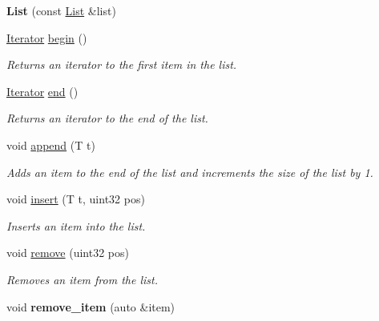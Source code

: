 \begin{DoxyCompactItemize}
\item 
\hypertarget{classetk_1_1_list_ac85e0e37f248ba1b52f410cd00c8c304}{{\bfseries List} (const \hyperlink{classetk_1_1_list}{List} \&list)}\label{classetk_1_1_list_ac85e0e37f248ba1b52f410cd00c8c304}

\item 
\hypertarget{classetk_1_1_list_afb70c4551d2e9ebc6b4bb04337d081e6}{\hyperlink{classetk_1_1_list_1_1_iterator}{Iterator} \hyperlink{classetk_1_1_list_afb70c4551d2e9ebc6b4bb04337d081e6}{begin} ()}\label{classetk_1_1_list_afb70c4551d2e9ebc6b4bb04337d081e6}

\begin{DoxyCompactList}\small\item\em Returns an iterator to the first item in the list. \end{DoxyCompactList}\item 
\hypertarget{classetk_1_1_list_a19b25cd89872debc07cc002c18845578}{\hyperlink{classetk_1_1_list_1_1_iterator}{Iterator} \hyperlink{classetk_1_1_list_a19b25cd89872debc07cc002c18845578}{end} ()}\label{classetk_1_1_list_a19b25cd89872debc07cc002c18845578}

\begin{DoxyCompactList}\small\item\em Returns an iterator to the end of the list. \end{DoxyCompactList}\item 
\hypertarget{classetk_1_1_list_a45df48bc3bb87c2dd26e56f51115ab27}{void \hyperlink{classetk_1_1_list_a45df48bc3bb87c2dd26e56f51115ab27}{append} (T t)}\label{classetk_1_1_list_a45df48bc3bb87c2dd26e56f51115ab27}

\begin{DoxyCompactList}\small\item\em Adds an item to the end of the list and increments the size of the list by 1. \end{DoxyCompactList}\item 
void \hyperlink{classetk_1_1_list_a95d6852055e5669632da51c6aa60e949}{insert} (T t, uint32 pos)
\begin{DoxyCompactList}\small\item\em Inserts an item into the list. \end{DoxyCompactList}\item 
void \hyperlink{classetk_1_1_list_a720fec604f6c57135b6796167171756a}{remove} (uint32 pos)
\begin{DoxyCompactList}\small\item\em Removes an item from the list. \end{DoxyCompactList}\item 
\hypertarget{classetk_1_1_list_a2b922183cf60d1bf3c351af927cfe51d}{void {\bfseries remove\-\_\-item} (auto \&item)}\label{classetk_1_1_list_a2b922183cf60d1bf3c351af927cfe51d}


\end{DoxyCompactItemize}
